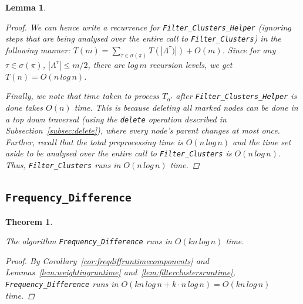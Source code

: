 \documentclass{article}
\newcommand{\leafset}{\Lambda}
\newtheorem{filterclustersruntime}[incompatibility]{Lemma}
\newtheorem{freqdiffruntime}[incompatibility]{Theorem}
\begin{document}
\begin{filterclustersruntime}
\begin{proof}
            We can hence write a recurrence for \texttt{Filter\_Clusters\_Helper} (ignoring steps that are being analysed over the entire call to \texttt{Filter\_Clusters}) in the following manner: $T(m) = \sum_{\tau \in \sigma(\pi)}T(|\leafset^{\tau})|) + O(m)$. Since for any $\tau \in \sigma(\pi)$, $|\leafset^{\tau}| \leq m/2$, there are $log\,m$ recursion levels, we get $T(n) = O(n\,log\,n)$.

            Finally, we note that time taken to process $T_{\alpha'}$ after \texttt{Filter\_Clusters\_Helper} is done takes $O(n)$ time. This is because deleting all marked nodes can be done in a top down traversal (using the \texttt{delete} operation described in Subsection~\ref{subsec:delete}), where every node's parent changes at most once. Further, recall that the total preprocessing time is $O(n\,log\,n)$ and the time set aside to be analysed over the entire call to \texttt{Filter\_Clusters} is $O(n\,log\,n)$. Thus, \texttt{Filter\_Clusters} runs in $O(n\,log\,n)$ time.
        \end{proof}
    \end{filterclustersruntime}

    \subsection{\texttt{Frequency\_Difference}}

    \begin{freqdiffruntime}
        \label{theorem:freqdiffruntime}

        The algorithm \texttt{Frequency\_Difference} runs in $O(kn\,log\,n)$ time.

        \begin{proof}
            By Corollary~\ref{cor:freqdiffruntimecomponents} and Lemmas~\ref{lem:weightingruntime} and~\ref{lem:filterclustersruntime}, \texttt{Frequency\_Difference} runs in $O(kn\,log\,n + k \cdot n\,log\,n) = O(kn\,log\,n)$ time.
        \end{proof}
    \end{freqdiffruntime}

    \newpage
    
    
\end{document}
